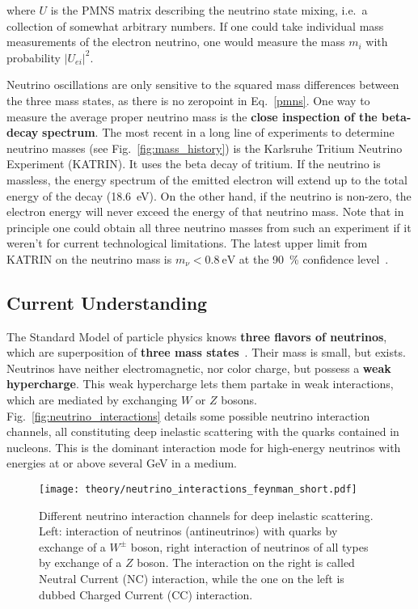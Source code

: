 where $U$ is the PMNS matrix describing the neutrino state mixing, i.e.\ a collection of somewhat arbitrary numbers. If one could take individual mass measurements of the electron neutrino, one would measure the mass $m_i$ with probability $|U_{ei}|^2$.

Neutrino oscillations are only sensitive to the squared mass differences between the three mass states, as there is no zeropoint in Eq.~\ref{pmns}. One way to measure the average proper neutrino mass is the \textbf{close inspection of the beta-decay} \textbf{spectrum}. The most recent in a long line of experiments to determine neutrino masses (see Fig.~\ref{fig:mass_history}) is the Karlsruhe Tritium Neutrino Experiment (KATRIN). It uses the beta decay of tritium. If the neutrino is massless, the energy spectrum of the emitted electron will extend up to the total energy of the decay (\SI{18.6}{\eV}). On the other hand, if the neutrino is non-zero, the electron energy will never exceed the energy of that neutrino mass. Note that in principle one could obtain all three neutrino masses from such an experiment if it weren't for current technological limitations. The latest upper limit from KATRIN on the neutrino mass is $m_\nu < \SI{0.8}{\eV}$ at the \SI{90}{\percent} confidence level~.


\subsection{Current Understanding}\label{neutrinos_current}
The Standard Model of particle physics knows \textbf{three flavors of neutrinos}, which are superposition of \textbf{three mass states}~. Their mass is small, but exists. Neutrinos have neither electromagnetic, nor color charge, but possess a \textbf{weak hypercharge}. This weak hypercharge lets them partake in weak interactions, which are mediated by exchanging $W$ or $Z$ bosons. Fig.~\ref{fig:neutrino_interactions} details some possible neutrino interaction channels, all constituting deep inelastic scattering with the quarks contained in nucleons. This is the dominant interaction mode for high-energy neutrinos with energies at or above several \unit{\giga\eV} in a medium.

\begin{figure}[htb]
    \texttt{[image: theory/neutrino\_interactions\_feynman\_short.pdf]}
    \caption[Neutrino interactions]{Different neutrino interaction channels for deep inelastic scattering. Left: interaction of neutrinos (antineutrinos) with quarks by exchange of a $W^{\pm}$ boson, right interaction of neutrinos of all types by exchange of a $Z$ boson. The interaction on the right is called Neutral Current (NC) interaction, while the one on the left is dubbed Charged Current (CC) interaction.}
\end{figure}

